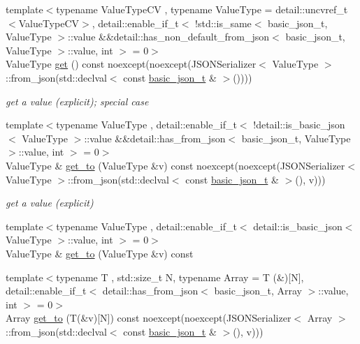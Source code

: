 \begin{DoxyCompactItemize}
{\footnotesize template$<$typename Value\+Type\+CV , typename Value\+Type  = detail\+::uncvref\+\_\+t$<$\+Value\+Type\+C\+V$>$, detail\+::enable\+\_\+if\+\_\+t$<$ !std\+::is\+\_\+same$<$ basic\+\_\+json\+\_\+t, Value\+Type $>$\+::value \&\&detail\+::has\+\_\+non\+\_\+default\+\_\+from\+\_\+json$<$ basic\+\_\+json\+\_\+t, Value\+Type $>$\+::value, int $>$  = 0$>$ }\\Value\+Type \hyperlink{classnlohmann_1_1basic__json_ad7c84027412c32e6dac101de144abf91}{get} () const noexcept(noexcept(J\+S\+O\+N\+Serializer$<$ Value\+Type $>$\+::from\+\_\+json(std\+::declval$<$ const \hyperlink{classnlohmann_1_1basic__json_a125c0afa5f3599949b0589ef7b4aa322}{basic\+\_\+json\+\_\+t} \& $>$())))
\begin{DoxyCompactList}\small\item\em get a value (explicit); special case \end{DoxyCompactList}\item 
{\footnotesize template$<$typename Value\+Type , detail\+::enable\+\_\+if\+\_\+t$<$ !detail\+::is\+\_\+basic\+\_\+json$<$ Value\+Type $>$\+::value \&\&detail\+::has\+\_\+from\+\_\+json$<$ basic\+\_\+json\+\_\+t, Value\+Type $>$\+::value, int $>$  = 0$>$ }\\Value\+Type \& \hyperlink{classnlohmann_1_1basic__json_aa1cbe06eb6b15f76e41c7c85081d2638}{get\+\_\+to} (Value\+Type \&v) const noexcept(noexcept(J\+S\+O\+N\+Serializer$<$ Value\+Type $>$\+::from\+\_\+json(std\+::declval$<$ const \hyperlink{classnlohmann_1_1basic__json_a125c0afa5f3599949b0589ef7b4aa322}{basic\+\_\+json\+\_\+t} \& $>$(), v)))
\begin{DoxyCompactList}\small\item\em get a value (explicit) \end{DoxyCompactList}\item 
{\footnotesize template$<$typename Value\+Type , detail\+::enable\+\_\+if\+\_\+t$<$ detail\+::is\+\_\+basic\+\_\+json$<$ Value\+Type $>$\+::value, int $>$  = 0$>$ }\\Value\+Type \& \hyperlink{classnlohmann_1_1basic__json_a038f6d70b18780e076047bd1ebd651d9}{get\+\_\+to} (Value\+Type \&v) const 
\item 
{\footnotesize template$<$typename T , std\+::size\+\_\+t N, typename Array  = T (\&)\mbox{[}\+N\mbox{]}, detail\+::enable\+\_\+if\+\_\+t$<$ detail\+::has\+\_\+from\+\_\+json$<$ basic\+\_\+json\+\_\+t, Array $>$\+::value, int $>$  = 0$>$ }\\Array \hyperlink{classnlohmann_1_1basic__json_a85dd41000e4e7751928fffb44ff4aed4}{get\+\_\+to} (T(\&v)\mbox{[}N\mbox{]}) const noexcept(noexcept(J\+S\+O\+N\+Serializer$<$ Array $>$\+::from\+\_\+json(std\+::declval$<$ const \hyperlink{classnlohmann_1_1basic__json_a125c0afa5f3599949b0589ef7b4aa322}{basic\+\_\+json\+\_\+t} \& $>$(), v)))

\end{DoxyCompactItemize}
